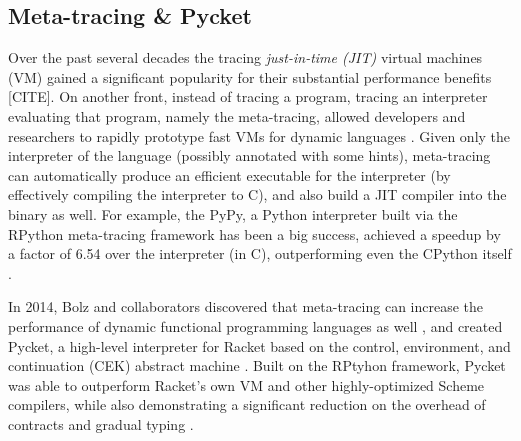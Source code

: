 \subsection{Meta-tracing \& Pycket}
\label{subsec:meta-trace}

Over the past several decades the tracing \emph{just-in-time (JIT)}
virtual machines (VM) gained a significant popularity for their
substantial performance benefits [CITE]. On another front, instead of
tracing a program, tracing an interpreter evaluating that program,
namely the meta-tracing, allowed developers and researchers to rapidly
prototype fast VMs for dynamic languages \cite{bolz09}. Given only the
interpreter of the language (possibly annotated with some hints),
meta-tracing can automatically produce an efficient executable for the
interpreter (by effectively compiling the interpreter to C), and also
build a JIT compiler into the binary as well. For example, the PyPy, a
Python interpreter built via the RPython meta-tracing framework has
been a big success, achieved a speedup by a factor of 6.54 over the
interpreter (in C), outperforming even the CPython itself
\cite{bolz09}.

In 2014, Bolz and collaborators discovered that meta-tracing can
increase the performance of dynamic functional programming languages
as well \cite{bolz14-racket}, and created Pycket, a high-level
interpreter for Racket based on the control, environment, and
continuation (CEK) abstract machine \cite{felleisen87}. Built on the
RPtyhon framework, Pycket was able to outperform Racket's own VM and
other highly-optimized Scheme compilers, while also demonstrating a
significant reduction on the overhead of contracts and gradual typing
\cite{pycket15,pycket17}.
